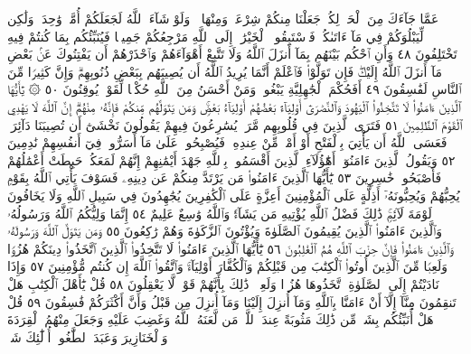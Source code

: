 عَمَّا جَآءَكَ مِنَ ٱلْحَقِّۚ لِكُلࣲّ جَعَلْنَا مِنكُمْ شِرْعَةࣰ وَمِنْهَاجࣰاۚ
وَلَوْ شَآءَ ٱللَّهُ لَجَعَلَكُمْ أُمَّةࣰ وَٰحِدَةࣰ وَلَٰكِن لِّيَبْلُوَكُمْ
فِي مَآ ءَاتَىٰكُمْۖ فَٱسْتَبِقُوا۟ ٱلْخَيْرَٰتِۚ إِلَى ٱللَّهِ مَرْجِعُكُمْ جَمِيعࣰا
فَيُنَبِّئُكُم بِمَا كُنتُمْ فِيهِ تَخْتَلِفُونَ ٤٨ وَأَنِ ٱحْكُم بَيْنَهُم
بِمَآ أَنزَلَ ٱللَّهُ وَلَا تَتَّبِعْ أَهْوَآءَهُمْ وَٱحْذَرْهُمْ أَن يَفْتِنُوكَ عَنۢ
بَعْضِ مَآ أَنزَلَ ٱللَّهُ إِلَيْكَۖ فَإِن تَوَلَّوْا۟ فَٱعْلَمْ أَنَّمَا يُرِيدُ ٱللَّهُ أَن يُصِيبَهُم
بِبَعْضِ ذُنُوبِهِمْۗ وَإِنَّ كَثِيرࣰا مِّنَ ٱلنَّاسِ لَفَٰسِقُونَ ٤٩ أَفَحُكْمَ
ٱلْجَٰهِلِيَّةِ يَبْغُونَۚ وَمَنْ أَحْسَنُ مِنَ ٱللَّهِ حُكْمࣰا لِّقَوْمࣲ يُوقِنُونَ ٥٠
۞ يَٰٓأَيُّهَا ٱلَّذِينَ ءَامَنُوا۟ لَا تَتَّخِذُوا۟ ٱلْيَهُودَ وَٱلنَّصَٰرَىٰٓ أَوْلِيَآءَۘ بَعْضُهُمْ
أَوْلِيَآءُ بَعْضࣲۚ وَمَن يَتَوَلَّهُم مِّنكُمْ فَإِنَّهُۥ مِنْهُمْۗ إِنَّ ٱللَّهَ لَا يَهْدِي ٱلْقَوْمَ
ٱلظَّٰلِمِينَ ٥١ فَتَرَى ٱلَّذِينَ فِي قُلُوبِهِم مَّرَضࣱ يُسَٰرِعُونَ فِيهِمْ يَقُولُونَ
نَخْشَىٰٓ أَن تُصِيبَنَا دَآئِرَةࣱۚ فَعَسَى ٱللَّهُ أَن يَأْتِيَ بِٱلْفَتْحِ أَوْ أَمْرࣲ مِّنْ عِندِهِۦ
فَيُصْبِحُوا۟ عَلَىٰ مَآ أَسَرُّوا۟ فِيٓ أَنفُسِهِمْ نَٰدِمِينَ ٥٢ وَيَقُولُ ٱلَّذِينَ ءَامَنُوٓا۟
أَهَٰٓؤُلَآءِ ٱلَّذِينَ أَقْسَمُوا۟ بِٱللَّهِ جَهْدَ أَيْمَٰنِهِمْ إِنَّهُمْ لَمَعَكُمْۚ حَبِطَتْ
أَعْمَٰلُهُمْ فَأَصْبَحُوا۟ خَٰسِرِينَ ٥٣ يَٰٓأَيُّهَا ٱلَّذِينَ ءَامَنُوا۟ مَن يَرْتَدَّ
مِنكُمْ عَن دِينِهِۦ فَسَوْفَ يَأْتِي ٱللَّهُ بِقَوْمࣲ يُحِبُّهُمْ وَيُحِبُّونَهُۥٓ أَذِلَّةٍ
عَلَى ٱلْمُؤْمِنِينَ أَعِزَّةٍ عَلَى ٱلْكَٰفِرِينَ يُجَٰهِدُونَ فِي سَبِيلِ ٱللَّهِ وَلَا
يَخَافُونَ لَوْمَةَ لَآئِمࣲۚ ذَٰلِكَ فَضْلُ ٱللَّهِ يُؤْتِيهِ مَن يَشَآءُۚ وَٱللَّهُ وَٰسِعٌ
عَلِيمٌ ٥٤ إِنَّمَا وَلِيُّكُمُ ٱللَّهُ وَرَسُولُهُۥ وَٱلَّذِينَ ءَامَنُوا۟ ٱلَّذِينَ يُقِيمُونَ
ٱلصَّلَوٰةَ وَيُؤْتُونَ ٱلزَّكَوٰةَ وَهُمْ رَٰكِعُونَ ٥٥ وَمَن يَتَوَلَّ ٱللَّهَ وَرَسُولَهُۥ
وَٱلَّذِينَ ءَامَنُوا۟ فَإِنَّ حِزْبَ ٱللَّهِ هُمُ ٱلْغَٰلِبُونَ ٥٦ يَٰٓأَيُّهَا ٱلَّذِينَ ءَامَنُوا۟
لَا تَتَّخِذُوا۟ ٱلَّذِينَ ٱتَّخَذُوا۟ دِينَكُمْ هُزُوࣰا وَلَعِبࣰا مِّنَ ٱلَّذِينَ أُوتُوا۟
ٱلْكِتَٰبَ مِن قَبْلِكُمْ وَٱلْكُفَّارَ أَوْلِيَآءَۚ وَٱتَّقُوا۟ ٱللَّهَ إِن كُنتُم مُّؤْمِنِينَ ٥٧
وَإِذَا نَادَيْتُمْ إِلَى ٱلصَّلَوٰةِ ٱتَّخَذُوهَا هُزُوࣰا وَلَعِبࣰاۚ ذَٰلِكَ بِأَنَّهُمْ قَوْمࣱ
لَّا يَعْقِلُونَ ٥٨ قُلْ يَٰٓأَهْلَ ٱلْكِتَٰبِ هَلْ تَنقِمُونَ مِنَّآ إِلَّآ أَنْ ءَامَنَّا
بِٱللَّهِ وَمَآ أُنزِلَ إِلَيْنَا وَمَآ أُنزِلَ مِن قَبْلُ وَأَنَّ أَكْثَرَكُمْ فَٰسِقُونَ ٥٩
قُلْ هَلْ أُنَبِّئُكُم بِشَرࣲّ مِّن ذَٰلِكَ مَثُوبَةً عِندَ ٱللَّهِۚ مَن لَّعَنَهُ ٱللَّهُ وَغَضِبَ
عَلَيْهِ وَجَعَلَ مِنْهُمُ ٱلْقِرَدَةَ وَٱلْخَنَازِيرَ وَعَبَدَ ٱلطَّٰغُوتَۚ أُو۟لَٰٓئِكَ شَرࣱّ
